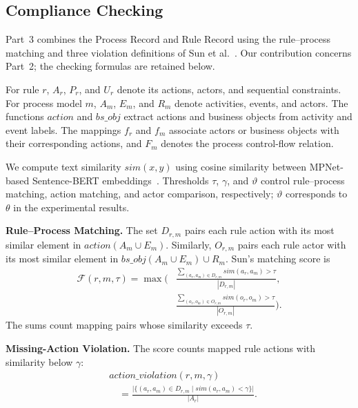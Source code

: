 \documentclass[conference]{IEEEtran}
\begin{document}
\setcounter{section}{3}
\setcounter{subsection}{2}
\subsection{Compliance Checking}
\label{sec:3.3}

Part~3 combines the Process Record and Rule Record using the rule--process matching and three violation definitions of Sun et al.~\cite{sun2024design}. Our contribution concerns Part~2; the checking formulas are retained below.

For rule \(r\), \(A_r\), \(P_r\), and \(U_r\) denote its actions, actors, and sequential constraints. For process model \(m\), \(A_m\), \(E_m\), and \(R_m\) denote activities, events, and actors. The functions \(action\) and \(\mathit{bs\_obj}\) extract actions and business objects from activity and event labels. The mappings \(f_r\) and \(f_m\) associate actors or business objects with their corresponding actions, and \(F_m\) denotes the process control-flow relation.

We compute text similarity \(sim(x,y)\) using cosine similarity between MPNet-based Sentence-BERT embeddings~\cite{reimers2019sentence,song2020mpnet}. Thresholds \(\tau\), \(\gamma\), and \(\vartheta\) control rule--process matching, action matching, and actor comparison, respectively; \(\vartheta\) corresponds to \(\theta\) in the experimental results.

\textbf{Rule--Process Matching.}
The set \(D_{r,m}\) pairs each rule action with its most similar element in \(action(A_m\cup E_m)\). Similarly, \(O_{r,m}\) pairs each rule actor with its most similar element in \(\mathit{bs\_obj}(A_m\cup E_m)\cup R_m\). Sun's matching score is
\begin{equation}
\begin{aligned}
\mathcal{F}(r,m,\tau)
=\max\Biggl(
&\frac{\displaystyle\sum_{(a_r,a_m)\in D_{r,m}}
sim(a_r,a_m)>\tau}{|D_{r,m}|},\\[2pt]
&\frac{\displaystyle\sum_{(o_r,o_m)\in O_{r,m}}
sim(o_r,o_m)>\tau}{|O_{r,m}|}
\Biggr).
\end{aligned}
\label{eq:matching}
\end{equation}
The sums count mapping pairs whose similarity exceeds \(\tau\).

\textbf{Missing-Action Violation.}
The score counts mapped rule actions with similarity below \(\gamma\):
\begin{equation}
\begin{aligned}
&\mathit{action\_violation}(r,m,\gamma)\\
&\quad=
\frac{\bigl|\{(a_r,a_m)\in D_{r,m}
\mid sim(a_r,a_m)<\gamma\}\bigr|}{|A_r|}.
\end{aligned}
\label{eq:missing}
\end{equation}
\end{document}
